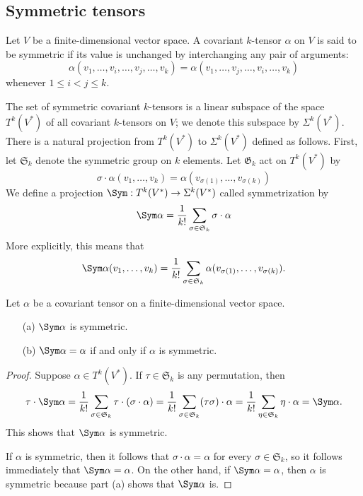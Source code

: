 \subsection{Symmetric tensors}
Let $V$ be a finite-dimensional vector space. A covariant $k$-tensor $\alpha$ on $V$ is said to be symmetric if its value is unchanged by interchanging any pair of arguments:
\[\alpha(v_1,\dots,v_i,\dots,v_j,\dots,v_k)=\alpha(v_1,\dots,v_j,\dots,v_i,\dots,v_k)\]
whenever $1\leq i<j\leq k$.\par
The set of symmetric covariant $k$-tensors is a linear subspace of the space $T^k(V^*)$ of all covariant $k$-tensors on $V$; we denote this subspace by $\Sigma^k(V^*)$. There is a natural projection from $T^k(V^*)$ to $\Sigma^k(V^*)$ defined as follows. First, let $\mathfrak{S}_k$ denote the symmetric group on $k$ elements. Let $\mathfrak{G}_k$ act on $T^k(V^*)$ by
\[\sigma\cdot\alpha(v_1,\dots,v_k)=\alpha(v_{\sigma(1)},\dots,v_{\sigma(k)})\]
We define a projection $\Sym:T^k(V^*)\to\Sigma^k(V^*)$ called symmetrization by
\[\Sym\alpha=\frac{1}{k!}\sum_{\sigma\in\mathfrak{S}_k}\sigma\cdot\alpha\]
More explicitly, this means that
\[\Sym\alpha(v_1,\dots,v_k)=\frac{1}{k!}\sum_{\sigma\in\mathfrak{S}_k}\alpha(v_{\sigma(1)},\dots,v_{\sigma(k)}).\]
\begin{proposition}\label{symmetrization prop}
Let $\alpha$ be a covariant tensor on a finite-dimensional vector space.
\begin{itemize}
\item[(a)] $\Sym\alpha$ is symmetric.
\item[(b)] $\Sym\alpha=\alpha$ if and only if $\alpha$ is symmetric.
\end{itemize}
\end{proposition}
\begin{proof}
Suppose $\alpha\in T^k(V^*)$. If $\tau\in\mathfrak{S}_k$ is any permutation, then
\begin{align*}
\tau\cdot\Sym\alpha=\frac{1}{k!}\sum_{\sigma\in\mathfrak{S}_k}\tau\cdot(\sigma\cdot\alpha)=\frac{1}{k!}\sum_{\sigma\in\mathfrak{S}_k}(\tau\sigma)\cdot\alpha=\frac{1}{k!}\sum_{\eta\in\mathfrak{S}_k}\eta\cdot\alpha=\Sym\alpha.
\end{align*}
This shows that $\Sym\alpha$ is symmetric.\par
If $\alpha$ is symmetric, then it follows that $\sigma\cdot\alpha=\alpha$ for every $\sigma\in\mathfrak{S}_k$, so it follows immediately that $\Sym\alpha=\alpha$. On the other hand, if $\Sym\alpha=\alpha$, then $\alpha$ is symmetric because part (a) shows that $\Sym\alpha$ is.
\end{proof}
